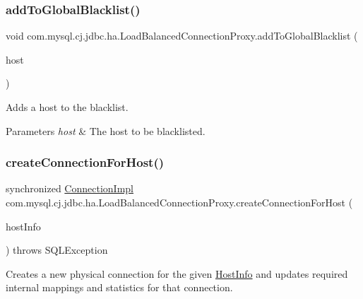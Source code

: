 \subsubsection{\texorpdfstring{add\+To\+Global\+Blacklist()}{addToGlobalBlacklist()}\hspace{0.1cm}{\footnotesize\ttfamily [2/2]}}
{\footnotesize\ttfamily void com.\+mysql.\+cj.\+jdbc.\+ha.\+Load\+Balanced\+Connection\+Proxy.\+add\+To\+Global\+Blacklist (\begin{DoxyParamCaption}\item[{String}]{host }\end{DoxyParamCaption})}

Adds a host to the blacklist.


\begin{DoxyParams}{Parameters}
{\em host} & The host to be blacklisted. \\
\hline
\end{DoxyParams}
\mbox{\label{classcom_1_1mysql_1_1cj_1_1jdbc_1_1ha_1_1_load_balanced_connection_proxy_ad26b7e7a242eeab7a90983f6e5095779}} 
\subsubsection{\texorpdfstring{create\+Connection\+For\+Host()}{createConnectionForHost()}\hspace{0.1cm}{\footnotesize\ttfamily [1/2]}}
{\footnotesize\ttfamily synchronized \mbox{\hyperlink{classcom_1_1mysql_1_1cj_1_1jdbc_1_1_connection_impl}{Connection\+Impl}} com.\+mysql.\+cj.\+jdbc.\+ha.\+Load\+Balanced\+Connection\+Proxy.\+create\+Connection\+For\+Host (\begin{DoxyParamCaption}\item[{\mbox{\hyperlink{classcom_1_1mysql_1_1cj_1_1conf_1_1_host_info}{Host\+Info}}}]{host\+Info }\end{DoxyParamCaption}) throws S\+Q\+L\+Exception}

Creates a new physical connection for the given \mbox{\hyperlink{}{Host\+Info}} and updates required internal mappings and statistics for that connection.


